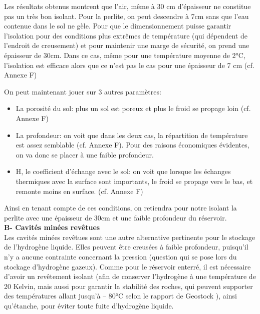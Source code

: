 \documentclass[11pt,french,a4paper]{article}
\begin{document}
Les résultats obtenus montrent que l’air, même à 30 cm d’épaisseur ne constitue pas un très bon isolant. Pour la perlite, on peut descendre à 7cm sans que l’eau contenue dans le sol ne gèle. Pour que le dimensionnement puisse garantir l’isolation pour des conditions plus extrêmes de température (qui dépendent de l’endroit de creusement) et pour maintenir une marge de sécurité, on prend une épaisseur de 30cm.
Dans ce cas, même pour une température moyenne de 2°C, l’isolation est efficace alors que ce n’est pas le cas pour une épaisseur de 7 cm (cf. Annexe F) 

On peut maintenant jouer sur 3 autres paramètres: 
\begin{itemize}
\item La porosité du sol: plus un sol est poreux et plus le froid se propage loin (cf. Annexe F)
\item La profondeur: on voit que dans les deux cas, la répartition de température est assez semblable (cf. Annexe F). Pour des raisons économiques évidentes, on va donc se placer à une faible profondeur.
\item H, le coefficient d’échange avec le sol: on voit que lorsque les échanges thermiques avec la surface sont importants, le froid se propage vers le bas, et remonte moins en surface. (cf. Annexe F)
\end{itemize}

Ainsi en tenant compte de ces conditions, on retiendra pour notre isolant la perlite avec une épaisseur de 30cm et une faible profondeur du réservoir. \\

\textbf{B- Cavités minées revêtues}\\

Les cavités minées revêtues sont une autre alternative pertinente pour le stockage de l’hydrogène liquide. Elles peuvent être creusées à faible profondeur, puisqu’il n’y a aucune contrainte concernant la pression (question qui se pose lors du stockage d’hydrogène gazeux). Comme pour le réservoir enterré, il est nécessaire d’avoir un revêtement isolant (afin de conserver l’hydrogène à une température de 20 Kelvin, mais aussi pour garantir la stabilité des roches, qui peuvent supporter des températures allant jusqu’à – 80°C selon le rapport de Geostock \cite{Geostock_2022}), ainsi qu’étanche, pour éviter toute fuite d’hydrogène liquide.
\end{document}
